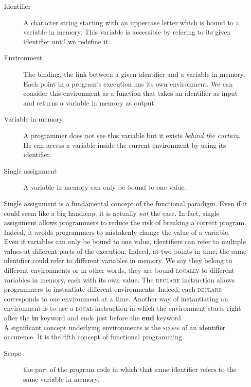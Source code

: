\documentclass[11pt,a4paper,twoside,openright]{report}
\begin{document}
\begin{description}
 \item[Identifier] A character string starting with an uppercase letter which 
is bound to a variable in memory. This variable is accessible by refering to 
its given identifier until we redefine it.
 \item[Environment] The binding, the link between a given identifier and a 
variable in memory. Each point in a program's execution has its own 
environment. We can consider this environment as a function that takes an 
identifier as input and returns a variable in memory as output.
 \item[Variable in memory] A programmer does not see this variable but it 
exists \textit{behind the curtain}. He can access a variable inside the current 
environment by using its identifier.
 \item[Single assignment] A variable in memory can only be bound to one value. 
\end{description}

Single assignment is a fundamental concept of the functional paradigm. Even if 
it could seem like a big handicap, it is actually \textit{not} the case. In 
fact, single assignment allows programmers to reduce the risk of breaking a 
correct program. Indeed, it avoids programmers to mistakenly change the value 
of a variable.\\

Even if variables can only be bound to one value, identifiers can refer to 
multiple values at different parts of the execution. Indeed, at two points in 
time, the same identifier could refer to different variables in memory. We say 
they belong to different environments or in other words, they are bound 
\textsc{locally} to different variables in memory, each with its own value.
The \textsc{declare} instruction allows programmers to instantiate different 
environments. Indeed, each \textsc{declare} corresponds to one environment at a time. 
Another way of instantiating an environment is to use a \textsc{local} 
instruction in which the environment starts right after the \textbf{in} keyword 
and ends just before the \textbf{end} keyword.\\

A significant concept underlying environments is the \textsc{scope} of an 
identifier occurence. It is the fifth concept of functional programming.

\begin{description}
 \item[Scope] the part of the program code in which that same identifier refers 
to the same variable in memory.
\end{description}
\end{document}
